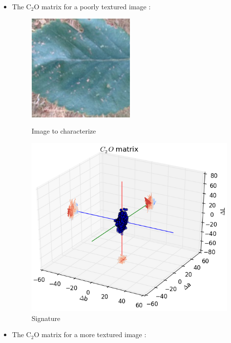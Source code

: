 \documentclass[xcolor=table]{beamer}
\begin{document}
\begin{frame}
\begin{itemize}
\item<1-> The C$_2$O matrix for a poorly textured image :
 {\begin{figure}[htbp]
    \begin{minipage}[c]{.40\linewidth}
      \begin{center}
    \includegraphics[scale=1.0]{61p.jpg}
    \caption{Image to characterize}
    \label{fig:Sig}
      \end{center}
    \end{minipage}
    \hfill
    \begin{minipage}[c]{.55\linewidth}
      \begin{center}
    \includegraphics[scale=0.38]{C2OMat61p.png}
    \caption{Signature}
    \label{fig:Sig}
      \end{center}
    \end{minipage}
\end{figure}}
\item<2-> The C$_2$O matrix for a more textured image :

\end{itemize}
\end{frame}
\end{document}
